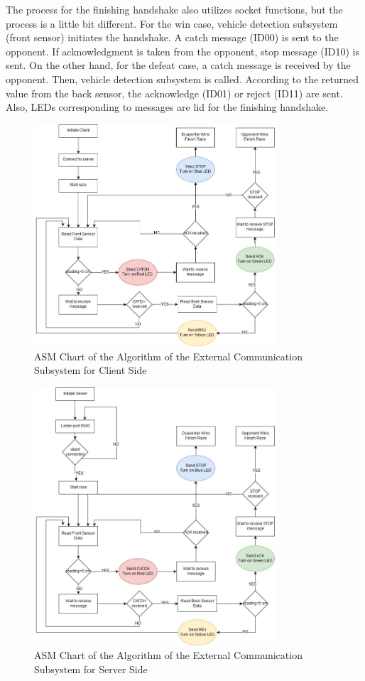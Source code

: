 \documentclass[a4paper,12pt]{article}
\begin{document}
\begin{enumerate}
	The process for the finishing handshake also utilizes socket functions, but the process is a little bit different. For the win case, vehicle detection subsystem (front sensor) initiates the handshake. A catch message (ID00) is sent to the opponent. If acknowledgment is taken from the opponent, stop message (ID10) is sent. On the other hand, for the defeat case, a catch message is received by the opponent. Then, vehicle detection subsystem is called. According to the returned value from the back sensor, the acknowledge (ID01) or reject (ID11) are sent. Also, LEDs corresponding to messages are lid for the finishing handshake.
	
	\begin{figure}[h]
		\includegraphics[width=0.8\textwidth,center]{images/client_asm}
		\caption{ASM Chart of the Algorithm of the External Communication Subsystem for Client Side \label{fig:asmclient} }
	\end{figure}
	
	\begin{figure}[h]
		\includegraphics[width=0.8\textwidth,center]{images/server_asm}
		\caption{ASM Chart of the Algorithm of the External Communication Subsystem for Server Side \label{fig:asmserver} }
	\end{figure}
	

\end{enumerate}
\end{document}
